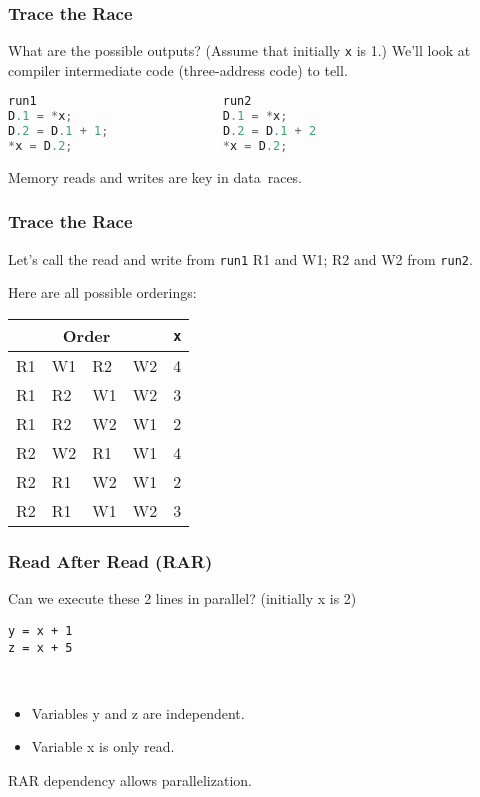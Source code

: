 \begin{frame}[fragile]
\frametitle{Trace the Race}

What are the possible outputs? (Assume that initially {\tt *x} is 1.)
We'll look at compiler intermediate code (three-address code) to tell.

\hspace*{.2\textwidth}\begin{minipage}{.8\textwidth}
\begin{lstlisting}[language=C]
run1                          run2   
D.1 = *x;                     D.1 = *x;
D.2 = D.1 + 1;                D.2 = D.1 + 2
*x = D.2;                     *x = D.2;
  \end{lstlisting}
\end{minipage}

Memory reads and writes are key in data~races.

\end{frame}



\begin{frame}
\frametitle{Trace the Race}
Let's call the read and write from {\tt run1} R1 and W1; R2 and W2
from {\tt run2}.

Here are all possible orderings:
  \begin{center}
    \begin{tabular}{llll|l}
\multicolumn{4}{c|}{Order} & {\tt *x}\\
\hline
R1 & W1 & R2 & W2 & 4 \\
R1 & R2 & W1 & W2 & 3 \\
R1 & R2 & W2 & W1 & 2 \\
R2 & W2 & R1 & W1 & 4 \\
R2 & R1 & W2 & W1 & 2 \\
R2 & R1 & W1 & W2 & 3 \\
    \end{tabular}
  \end{center}

\end{frame}

\begin{frame}[fragile]
\frametitle{Read After Read (RAR)}

Can we execute these 2 lines in parallel? (initially x is 2)
\begin{lstlisting}
y = x + 1
z = x + 5
\end{lstlisting}
\pause
{}\\[1em]
\begin{itemize}
\item Variables y and z are independent.
\item Variable x is only read.
\end{itemize}

RAR dependency allows parallelization.



\end{frame}

